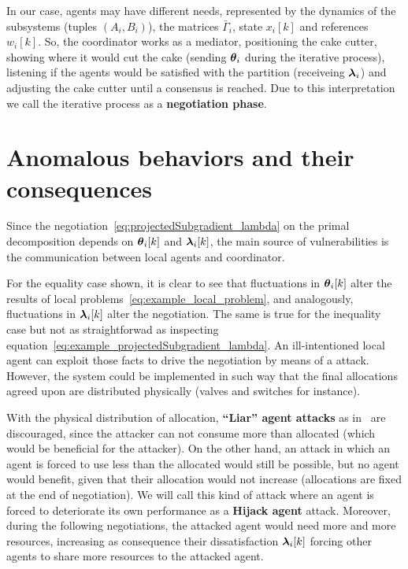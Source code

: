 \documentclass[../main.tex]{subfiles}
\begin{document}
In our case, agents may have different needs, represented by the dynamics of the subsystems (tuples $(A_{i},B_{i})$), the matrices $\bar{\Gamma}_{i}$, state $x_{i}[k]$ and references $w_{i}[k]$.
So, the coordinator works as a mediator, positioning the cake cutter, showing where it would cut the cake (sending $\boldsymbol{\theta}_i$ during the iterative process), listening if the agents would be satisfied with the partition (receiveing $\boldsymbol{\lambda}_i$) and adjusting the cake cutter until a consensus is reached.
Due to this interpretation we call the iterative process as a \textbf{negotiation phase}.



\section[Anomalous behaviors and their consequences]{Anomalous behaviors and their consequences}\label{sec:vulnerabilities_PD}

Since the negotiation~\eqref{eq:projectedSubgradient_lambda} on the primal decomposition depends on $\thetaik$ and $\lambdaik$, the main source of vulnerabilities is the communication between local agents and coordinator.

For the equality case shown, it is clear to see that fluctuations in $\thetaik$ alter the results of local problems~\eqref{eq:example_local_problem}, and analogously, fluctuations in $\lambdaik$ alter the negotiation.
The same is true for the inequality case but not as straightforwad as inspecting equation~\eqref{eq:example_projectedSubgradient_lambda}.
An ill-intentioned local agent can exploit those facts to drive the negotiation by means of a \fdi{} attack.
However, the system could be implemented in such way that the final allocations agreed upon are distributed physically (valves and switches for instance).

With the physical distribution of allocation, \textbf{``Liar'' agent attacks} as in~\cite{VelardeEtAl2017b} are discouraged, since the attacker can not consume more than allocated (which would be beneficial for the attacker).
On the other hand, an attack in which an agent is forced to use less than the allocated would still be possible, but no agent would benefit, given that their allocation would not increase (allocations are fixed at the end of negotiation).
We will call this kind of attack where an agent is forced to deteriorate its own performance as a \textbf{Hijack agent} attack.
Moreover, during the following negotiations, the attacked agent would need more and more resources, increasing as consequence their dissatisfaction $\lambdaik$ forcing other agents to share more resources to the attacked agent.
\end{document}
